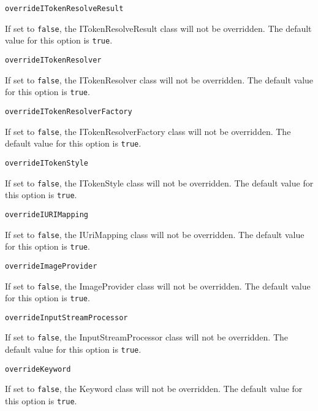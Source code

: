 \noindent\texttt{overrideITokenResolveResult}
\begin{myindentpar}{1cm}
If set to \texttt{false}, the ITokenResolveResult class will not be overridden. The default value for this option is \texttt{true}.
\end{myindentpar}

\noindent\texttt{overrideITokenResolver}
\begin{myindentpar}{1cm}
If set to \texttt{false}, the ITokenResolver class will not be overridden. The default value for this option is \texttt{true}.
\end{myindentpar}

\noindent\texttt{overrideITokenResolverFactory}
\begin{myindentpar}{1cm}
If set to \texttt{false}, the ITokenResolverFactory class will not be overridden. The default value for this option is \texttt{true}.
\end{myindentpar}

\noindent\texttt{overrideITokenStyle}
\begin{myindentpar}{1cm}
If set to \texttt{false}, the ITokenStyle class will not be overridden. The default value for this option is \texttt{true}.
\end{myindentpar}

\noindent\texttt{overrideIURIMapping}
\begin{myindentpar}{1cm}
If set to \texttt{false}, the IUriMapping class will not be overridden. The default value for this option is \texttt{true}.
\end{myindentpar}

\noindent\texttt{overrideImageProvider}
\begin{myindentpar}{1cm}
If set to \texttt{false}, the ImageProvider class will not be overridden. The default value for this option is \texttt{true}.
\end{myindentpar}

\noindent\texttt{overrideInputStreamProcessor}
\begin{myindentpar}{1cm}
If set to \texttt{false}, the InputStreamProcessor class will not be overridden. The default value for this option is \texttt{true}.
\end{myindentpar}

\noindent\texttt{overrideKeyword}
\begin{myindentpar}{1cm}
If set to \texttt{false}, the Keyword class will not be overridden. The default value for this option is \texttt{true}.
\end{myindentpar}

